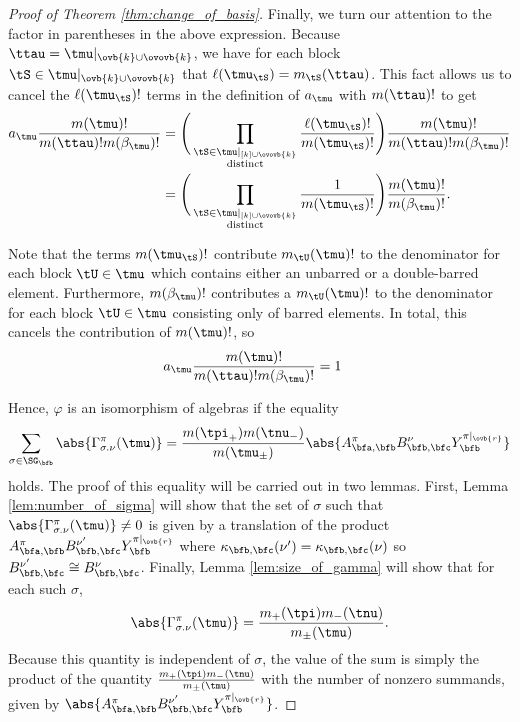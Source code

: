 \begin{proof}[Proof of Theorem \ref{thm:change_of_basis}]
    Finally, we turn our attention to the factor in parentheses in the above expression. Because $\ttau=\tmu|_{\ovb{k}\cup\ovovb{k}}$, we have for each block $\tS\in\tmu|_{\ovb{k}\cup\ovovb{k}}$ that $\ell(\tmu_{\tS})=m_{\tS}(\ttau)$. This fact allows us to cancel the $\ell(\tmu_\tS)!$ terms in the definition of $a_\tmu$ with $m(\ttau)!$ to get
    \begin{align*}
        a_\tmu\frac{m(\tmu)!}{m(\ttau)!m(\beta_\tmu)!}&=\Bigg(\prod_{\substack{\tS\in\tmu|_{[k]\cup\ovovb{k}}\\\text{distinct}}}\frac{\ell(\tmu_\tS)!}{m(\tmu_\tS)!}\Bigg)\frac{m(\tmu)!}{m(\ttau)!m(\beta_\tmu)!}\\
        &=\Bigg(\prod_{\substack{\tS\in\tmu|_{[k]\cup\ovovb{k}}\\\text{distinct}}}\frac{1}{m(\tmu_\tS)!}\Bigg)\frac{m(\tmu)!}{m(\beta_\tmu)!}.
    \end{align*} 

    Note that the terms $m(\tmu_\tS)!$ contribute $m_\tU(\tmu)!$ to the denominator for each block $\tU\in\tmu$ which contains either an unbarred or a double-barred element. Furthermore, $m(\beta_\tmu)!$ contributes a $m_\tU(\tmu)!$ to the denominator for each block $\tU\in\tmu$ consisting only of barred elements. In total, this cancels the contribution of $m(\tmu)!$, so \begin{align*}
        a_\tmu\frac{m(\tmu)!}{m(\ttau)!m(\beta_\tmu)!}&=1
    \end{align*}

    Hence, $\varphi$ is an isomorphism of algebras if the equality \[\sum_{\sigma\in\SG_\bfb}\abs{\Gamma^\pi_{\sigma.\nu}(\tmu)}=\frac{m(\tpi_+)m(\tnu_-)}{m(\tmu_\pm)}{\abs{A_{\bfa,\bfb}^\pi B_{\bfb,\bfc}^\nu Y_{\bfb}^{\pi|_{\ovb{r}}}}}\] holds. The proof of this equality will be carried out in two lemmas. First, Lemma \ref{lem:number_of_sigma} will show that the set of $\sigma$ such that $\abs{\Gamma_{\sigma.\nu}^\pi(\tmu)}\neq0$ is given by a translation of the product $A_{\bfa,\bfb}^\pi B_{\bfb,\bfc}^{\nu'} Y_\bfb^{\pi|_{\ovb{r}}}$ where $\kappa_{\bfb,\bfc}(\nu')=\kappa_{\bfb,\bfc}(\nu)$ so $B_{\bfb,\bfc}^{\nu'}\cong B_{\bfb,\bfc}^{\nu}$. Finally, Lemma \ref{lem:size_of_gamma} will show that for each such $\sigma$, \begin{align*}
        \abs{\Gamma_{\sigma.\nu}^\pi(\tmu)}=\frac{m_+(\tpi)m_-(\tnu)}{m_\pm(\tmu)}.
    \end{align*} Because this quantity is independent of $\sigma$, the value of the sum is simply the product of the quantity $\frac{m_+(\tpi)m_-(\tnu)}{m_\pm(\tmu)}$ with the number of nonzero summands, given by $\abs{A_{\bfa,\bfb}^\pi B_{\bfb,\bfc}^{\nu'} Y_\bfb^{\pi|_{\ovb{r}}}}$.
\end{proof}


